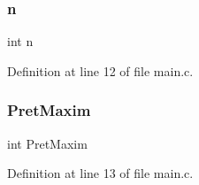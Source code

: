 \mbox{\label{main_8c_a76f11d9a0a47b94f72c2d0e77fb32240}} 
\subsubsection{n}
{\footnotesize\ttfamily int n}



Definition at line 12 of file main.\+c.

\mbox{\label{main_8c_ac3eb8db17fea6f06278fb25ab78664ac}} 
\subsubsection{Pret\+Maxim}
{\footnotesize\ttfamily int Pret\+Maxim}



Definition at line 13 of file main.\+c.

